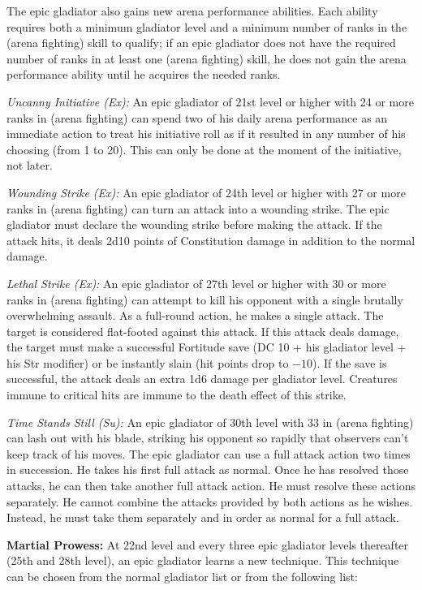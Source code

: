 The epic gladiator also gains new arena performance abilities. Each ability requires both a minimum gladiator level and a minimum number of ranks in the  (arena fighting) skill to qualify; if an epic gladiator does not have the required number of ranks in at least one  (arena fighting) skill, he does not gain the arena performance ability until he acquires the needed ranks.

\textit{Uncanny Initiative (Ex):} An epic gladiator of 21st level or higher with 24 or more ranks in  (arena fighting) can spend two of his daily arena performance as an immediate action to treat his initiative roll as if it resulted in any number of his choosing (from 1 to 20). This can only be done at the moment of the initiative, not later.

\textit{Wounding Strike (Ex):} An epic gladiator of 24th level or higher with 27 or more ranks in  (arena fighting) can turn an attack into a wounding strike. The epic gladiator must declare the wounding strike before making the attack. If the attack hits, it deals 2d10 points of Constitution damage in addition to the normal damage.

\textit{Lethal Strike (Ex):}  An epic gladiator of 27th level or higher with 30 or more ranks in  (arena fighting) can attempt to kill his opponent with a single brutally overwhelming assault. As a full-round action, he makes a single attack. The target is considered flat-footed against this attack. If this attack deals damage, the target must make a successful Fortitude save (DC 10 + \onehalf his gladiator level + his Str modifier) or be instantly slain (hit points drop to $-10$). If the save is successful, the attack deals an extra 1d6 damage per gladiator level. Creatures immune to critical hits are immune to the death effect of this strike.

\textit{Time Stands Still (Su):} An epic gladiator of 30th level with 33 in  (arena fighting) can lash out with his blade, striking his opponent so rapidly that observers can't keep track of his moves. The epic gladiator can use a full attack action two times in succession. He takes his first full attack as normal. Once he has resolved those attacks, he can then take another full attack action. He must resolve these actions separately. He cannot combine the attacks provided by both actions as he wishes. Instead, he must take them separately and in order as normal for a full attack.

\textbf{Martial Prowess:} At 22nd level and every three epic gladiator levels thereafter (25th and 28th level), an epic gladiator learns a new technique. This technique can be chosen from the normal gladiator list or from the following list:

